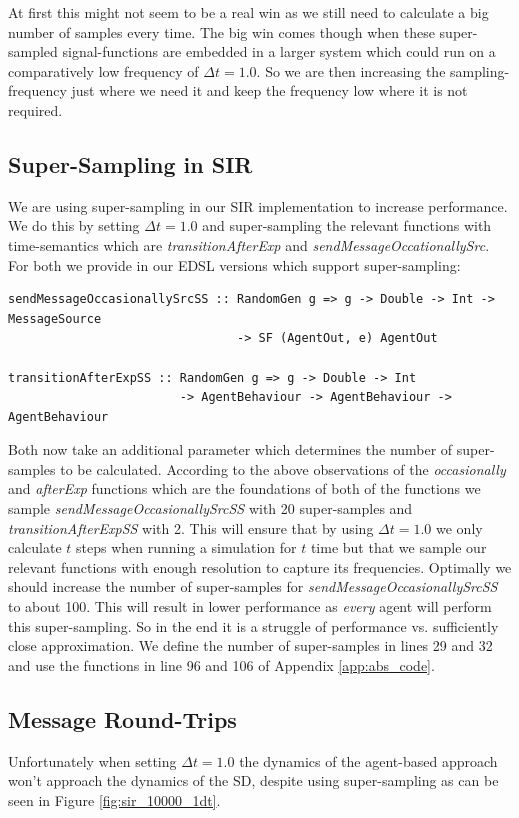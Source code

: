 At first this might not seem to be a real win as we still need to calculate a big number of samples every time. The big win comes though when these super-sampled signal-functions are embedded in a larger system which could run on a comparatively low frequency of $\Delta t = 1.0$. So we are then increasing the sampling-frequency just where we need it and keep the frequency low where it is not required.

\subsection*{Super-Sampling in SIR}
We are using super-sampling in our SIR implementation to increase performance. We do this by setting $\Delta t = 1.0$ and super-sampling the relevant functions with time-semantics which are \textit{transitionAfterExp} and \textit{sendMessageOccationallySrc}. For both we provide in our EDSL versions which support super-sampling:

\begin{verbatim}
sendMessageOccasionallySrcSS :: RandomGen g => g -> Double -> Int -> MessageSource 
                                -> SF (AgentOut, e) AgentOut
                                
transitionAfterExpSS :: RandomGen g => g -> Double -> Int 
                        -> AgentBehaviour -> AgentBehaviour -> AgentBehaviour
\end{verbatim}

Both now take an additional parameter which determines the number of super-samples to be calculated. According to the above observations of the \textit{occasionally} and \textit{afterExp} functions which are the foundations of both of the functions we sample \textit{sendMessageOccasionallySrcSS} with 20 super-samples and \textit{transitionAfterExpSS} with 2. This will ensure that by using $\Delta t = 1.0$ we only calculate $t$ steps when running a simulation for $t$ time but that we sample our relevant functions with enough resolution to capture its frequencies. Optimally we should increase the number of super-samples for \textit{sendMessageOccasionallySrcSS} to about 100. This will result in lower performance as \textit{every} agent will perform this super-sampling. So in the end it is a struggle of performance vs. sufficiently close approximation. We define the number of super-samples in lines 29 and 32 and use the functions in line 96 and 106 of Appendix \ref{app:abs_code}.

\subsection*{Message Round-Trips}
Unfortunately when setting $\Delta t = 1.0$ the dynamics of the agent-based approach won't approach the dynamics of the SD, despite using super-sampling as can be seen in Figure \ref{fig:sir_10000_1dt}.

